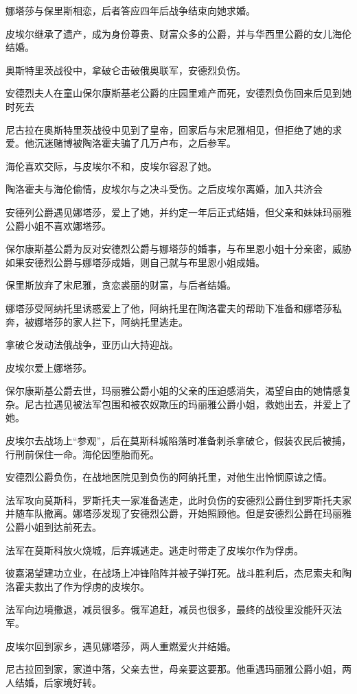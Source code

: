 \begin{itemize*}
	\item 娜塔莎与保里斯相恋，后者答应四年后战争结束向她求婚。
	\item 皮埃尔继承了遗产，成为身份尊贵、财富众多的公爵，并与华西里公爵的女儿海伦结婚。
	\item 奥斯特里茨战役中，拿破仑击破俄奥联军，安德烈负伤。
	\item 安德烈夫人在童山保尔康斯基老公爵的庄园里难产而死，安德烈负伤回来后见到她时死去
	\item 尼古拉在奥斯特里茨战役中见到了皇帝，回家后与宋尼雅相见，但拒绝了她的求爱。他沉迷赌博被陶洛霍夫骗了几万卢布，之后参军。
	\item 海伦喜欢交际，与皮埃尔不和，皮埃尔容忍了她。
	\item 陶洛霍夫与海伦偷情，皮埃尔与之决斗受伤。之后皮埃尔离婚，加入共济会
	\item 安德列公爵遇见娜塔莎，爱上了她，并约定一年后正式结婚，但父亲和妹妹玛丽雅公爵小姐不喜欢娜塔莎。
	\item 保尔康斯基公爵为反对安德烈公爵与娜塔莎的婚事，与布里恩小姐十分亲密，威胁如果安德烈公爵与娜塔莎成婚，则自己就与布里恩小姐成婚。
	\item 保里斯放弃了宋尼雅，贪恋裘丽的财富，与后者结婚。
	\item 娜塔莎受阿纳托里诱惑爱上了他，阿纳托里在陶洛霍夫的帮助下准备和娜塔莎私奔，被娜塔莎的家人拦下，阿纳托里逃走。
	\item 拿破仑发动法俄战争，亚历山大持迎战。
	\item 皮埃尔爱上娜塔莎。
	\item 保尔康斯基公爵去世，玛丽雅公爵小姐的父亲的压迫感消失，渴望自由的她情感复杂。尼古拉遇见被法军包围和被农奴欺压的玛丽雅公爵小姐，救她出去，并爱上了她。
	\item 皮埃尔去战场上“参观”，后在莫斯科城陷落时准备刺杀拿破仑，假装农民后被捕，行刑前保住一命。海伦因堕胎而死。
	\item 安德烈公爵负伤，在战地医院见到负伤的阿纳托里，对他生出怜悯原谅之情。
	\item 法军攻向莫斯科，罗斯托夫一家准备逃走，此时负伤的安德烈公爵住到罗斯托夫家并随车队撤离。娜塔莎发现了安德烈公爵，开始照顾他。但是安德烈公爵在玛丽雅公爵小姐到达前死去。
	\item 法军在莫斯科放火烧城，后弃城逃走。逃走时带走了皮埃尔作为俘虏。
	\item 彼嘉渴望建功立业，在战场上冲锋陷阵并被子弹打死。战斗胜利后，杰尼索夫和陶洛霍夫救出了作为俘虏的皮埃尔。
	\item 法军向边境撤退，减员很多。俄军追赶，减员也很多，最终的战役里没能歼灭法军。
	\item 皮埃尔回到家乡，遇见娜塔莎，两人重燃爱火并结婚。
	\item 尼古拉回到家，家道中落，父亲去世，母亲要这要那。他重遇玛丽雅公爵小姐，两人结婚，后家境好转。
\end{itemize*}

